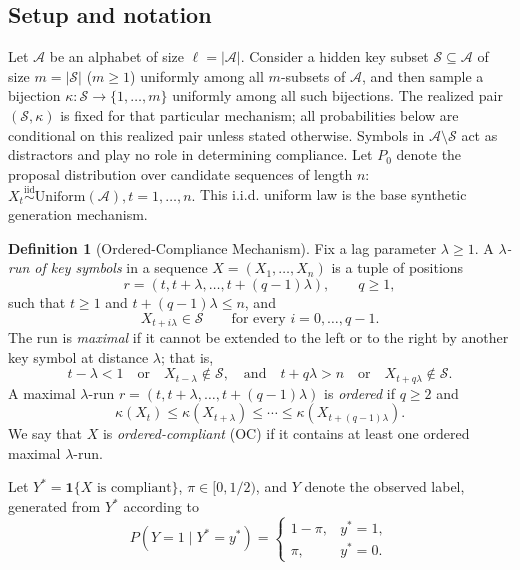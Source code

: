 \documentclass{article}
\theoremstyle{plain}
\theoremstyle{definition}
\newtheorem{definition}[theorem]{Definition}
\theoremstyle{remark}
\begin{document}
\subsection{Setup and notation}
\label{sec:setup}

Let $\mathcal{A}$ be an alphabet of size $\ell = |\mathcal{A}|$. Consider a hidden key subset $\mathcal{S} \subseteq \mathcal{A}$ of size $m = |\mathcal{S}|$ ($m \geq 1$) uniformly among all $m$-subsets of $\mathcal{A}$, and then sample a bijection $\kappa : \mathcal{S} \to \{1,\ldots,m\}$ uniformly among all such bijections. The realized pair $(\mathcal{S},\kappa)$ is fixed for that particular mechanism; all probabilities below are conditional on this realized pair unless stated otherwise. Symbols in $\mathcal{A}\setminus\mathcal{S}$ act as distractors and play no role in determining compliance. Let $P_0$ denote the proposal distribution over candidate sequences of length $n$: $X_t \stackrel{\mathrm{iid}}{\sim} \mathrm{Uniform}(\mathcal{A}), t=1,\ldots,n.$ This i.i.d. uniform law is the base synthetic generation mechanism.

\begin{definition}[Ordered-Compliance Mechanism]
\label{def:compliance}
Fix a lag parameter $\lambda \geq 1$. A \emph{$\lambda$-run of key symbols}
in a sequence $X=(X_1,\ldots,X_n)$ is a tuple of positions
\[
r=(t,t+\lambda,\ldots,t+(q-1)\lambda),
\qquad q\geq 1,
\]
such that $t \geq 1$ and $t+(q-1)\lambda\leq n$, and
\[
X_{t+i\lambda}\in\mathcal{S}
\qquad
\text{for every } i=0,\ldots,q-1.
\]
The run is \emph{maximal} if it cannot be extended to the left or to the right
by another key symbol at distance $\lambda$; that is,
\[
t-\lambda < 1
\quad\text{or}\quad
X_{t-\lambda}\notin\mathcal{S},
\quad\text{and}\quad t+q\lambda > n
\quad\text{or}\quad
X_{t+q\lambda}\notin\mathcal{S}.
\]
A maximal $\lambda$-run $r=(t,t+\lambda,\ldots,t+(q-1)\lambda)$ is
\emph{ordered} if $q\geq 2$ and
\[
\kappa(X_t)
\leq
\kappa(X_{t+\lambda})
\leq
\cdots
\leq
\kappa(X_{t+(q-1)\lambda}).
\]
We say that $X$ is \emph{ordered-compliant} (OC) if it contains at least one ordered
maximal $\lambda$-run.
\end{definition}

Let $Y^*=\mathbf{1}\{X \text{ is compliant}\}$, $\pi\in[0,1/2)$, and
$Y$ denote the observed label, generated from $Y^*$ according to
\begin{equation}
\label{eq:label_noise}
P(Y=1\mid Y^*=y^*)=
\begin{cases}
1-\pi, & y^*=1,\\
\pi, & y^*=0.
\end{cases}
\end{equation}
\end{document}
